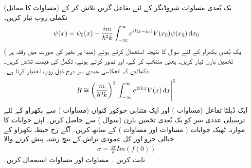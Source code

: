   
یک بُعدی مساوات شروڈنگر کے لئے تفاعل گرین تلاش کر کے  (مساوات   کا مماثل)  تکملی روپ تیار کریں۔
\begin{align}
	\psi(x)=\psi_0(x)-\frac{im}{\hslash^2k}\int_{-\infty}^{\infty}e^{ik\abs{x-x_0}}V(x_0)\psi(x_0)\dif x_0
\end{align}
یک بُعدی بکھراو کے لئے سوال    کا نتیجہ استعمال کرتے ہوئے (مبدا پر بغیر  کی صورت میں وقفہ  پر ) تخمین بارن تیار کریں۔ یعنی   منتخب کر کے، اور    تصور کرتے ہوئے، تکمل کی قیمت تلاش کریں۔ دکھائیں کہ انعکاسی عددی سر درج ذیل روپ اختیار کرتا ہے۔
\begin{align}
	R\cong\left(\frac{m}{\hslash^2k}\right)^2\abs{\int_{-\infty}^{\infty}e^{2ikx}V(x)\dif x}^2
\end{align}
ایک ڈیلٹا تفاعل (مساوات )  اور ایک متناہی چوکور کنواں (مساوات )  سے بکھراو کے لئے  ترسیلی  عددی سر  کو یک بُعدی تخمین بارن  (سوال )  سے حاصل کریں۔ اپنے جوابات کا    موازنہ ٹھیک جوابات ( مساوات   اور  مساوات )   کے ساتھ   کریں۔
آگے رخ حیطہ بکھراو کے خیالی جزو اور کل عمودی تراش کے بیچ رشتہ  پیش کرنے والا    
\begin{align}
	\sigma = \frac{4\pi}{k}Im(f(0))
\end{align}
ثابت کریں ۔   مساوات  اور مساوات    استعمال کریں۔

